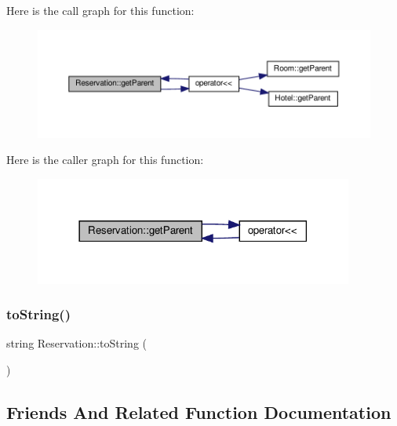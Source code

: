 Here is the call graph for this function\+:\nopagebreak
\begin{figure}[H]
\begin{center}
\leavevmode
\includegraphics[width=350pt]{class_reservation_ae2c3cb8475f8649e3d44c076d6340c2c_cgraph}
\end{center}
\end{figure}
Here is the caller graph for this function\+:\nopagebreak
\begin{figure}[H]
\begin{center}
\leavevmode
\includegraphics[width=297pt]{class_reservation_ae2c3cb8475f8649e3d44c076d6340c2c_icgraph}
\end{center}
\end{figure}
\mbox{\label{class_reservation_a7187041bfd3814ea69f0c51aabfed8ae}} 
\subsubsection{\texorpdfstring{to\+String()}{toString()}}
{\footnotesize\ttfamily string Reservation\+::to\+String (\begin{DoxyParamCaption}{ }\end{DoxyParamCaption})}



\subsection{Friends And Related Function Documentation}
\mbox{\label{class_reservation_ac5cc5f8866d66ef4e1c74dbc74380070}} 
